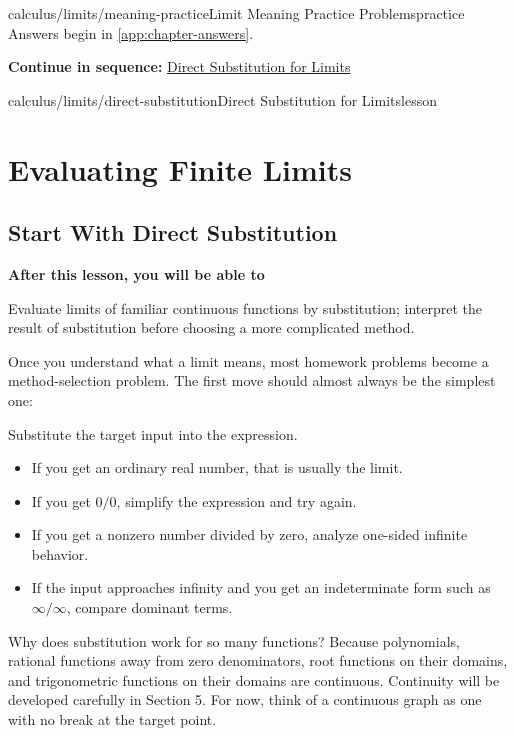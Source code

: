\documentclass[11pt,openany]{book}
\theoremstyle{bgplain}
\newcommand{\webnext}[2]{%
  \par\addvspace{1.2em}\noindent{\color{BGLine}\rule{\textwidth}{0.35pt}}\par\smallskip
  {\small\color{BGGray}\textbf{Continue in sequence:} \hyperlink{web:#1}{#2}}\par
}
\newcommand{\lessonobjective}[1]{%
  \par\Needspace{4\baselineskip}\addvspace{0.6em}%
  {\bfseries\color{BGInk}After this lesson, you will be able to}\par\smallskip
  #1\par\addvspace{0.5em}%
}
\begin{document}
\begin{webpage}{calculus/limits/meaning-practice}{Limit Meaning Practice Problems}{practice}
Answers begin in \cref{app:chapter-answers}.
\webnext{calculus/limits/direct-substitution}{Direct Substitution for Limits}
\end{webpage}




\begin{webpage}{calculus/limits/direct-substitution}{Direct Substitution for Limits}{lesson}
\chapter{Evaluating Finite Limits}

\section{Start With Direct Substitution}

\lessonobjective{
Evaluate limits of familiar continuous functions by substitution; interpret the result of substitution before choosing a more complicated method.
}

Once you understand what a limit means, most homework problems become a method-selection problem. The first move should almost always be the simplest one:

\begin{bgmethod}[title={First Move for Nearly Every Limit}]
Substitute the target input into the expression.

\begin{itemize}
  \item If you get an ordinary real number, that is usually the limit.
  \item If you get \(0/0\), simplify the expression and try again.
  \item If you get a nonzero number divided by zero, analyze one-sided infinite behavior.
  \item If the input approaches infinity and you get an indeterminate form such as \(\infty/\infty\), compare dominant terms.
\end{itemize}
\end{bgmethod}

Why does substitution work for so many functions? Because polynomials, rational functions away from zero denominators, root functions on their domains, and trigonometric functions on their domains are continuous. Continuity will be developed carefully in Section 5. For now, think of a continuous graph as one with no break at the target point.


\end{webpage}
\end{document}
